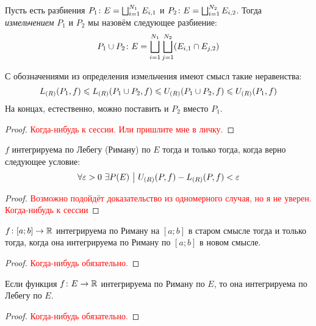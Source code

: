 \begin{definition}
	Пусть есть разбиения $P_1 \colon E = \bigsqcup_{i = 1}^{N_1} E_{i, 1}$ и $P_2 \colon E = \bigsqcup_{i = 1}^{N_2} E_{i, 2}$. Тогда \textit{измельчением} $P_1$ и $P_2$ мы назовём следующее разбиение:
	\[
		P_1 \cup P_2 \colon E = \bigsqcup_{i = 1}^{N_1} \bigsqcup_{j = 1}^{N_2} (E_{i, 1} \cap E_{j, 2})
	\]
\end{definition}

\begin{proposition}
	С обозначениями из определения измельчения имеют смысл такие неравенства:
	\[
		L_{(R)}(P_1, f) \leqslant L_{(R)}(P_1 \cup P_2, f) \leqslant U_{(R)}(P_1 \cup P_2, f) \leqslant U_{(R)}(P_1, f)
	\]
	На концах, естественно, можно поставить и $P_2$ вместо $P_1$.
\end{proposition}

\begin{proof}
	\textcolor{red}{Когда-нибудь к сессии. Или пришлите мне в личку.}
\end{proof}

\begin{proposition} \label{commonEquivLebeg}
	$f$ интегрируема по Лебегу (Риману) по $E$ тогда и только тогда, когда верно следующее условие:
	\[
		\forall \varepsilon > 0\ \exists P(E) \ \big|\  U_{(R)}(P, f) - L_{(R)}(P, f) < \varepsilon
	\]
\end{proposition}

\begin{proof}
	\textcolor{red}{Возможно подойдёт доказательство из одномерного случая, но я не уверен. Когда-нибудь к сессии}
\end{proof}

\begin{proposition}
	$f \colon [a; b] \to \mathbb{R}$ интегрируема по Риману на $[a; b]$ в старом смысле тогда и только тогда, когда она интегрируема по Риману по $[a; b]$ в новом смысле.
\end{proposition}

\begin{proof}
	\textcolor{red}{Когда-нибудь обязательно.}
\end{proof}

\begin{proposition}
	Если функция $f \colon E \to \mathbb{R}$ интегрируема по Риману по $E$, то она интегрируема по Лебегу по $E$.
\end{proposition}

\begin{proof}
	\textcolor{red}{Когда-нибудь обязательно.}
\end{proof}

